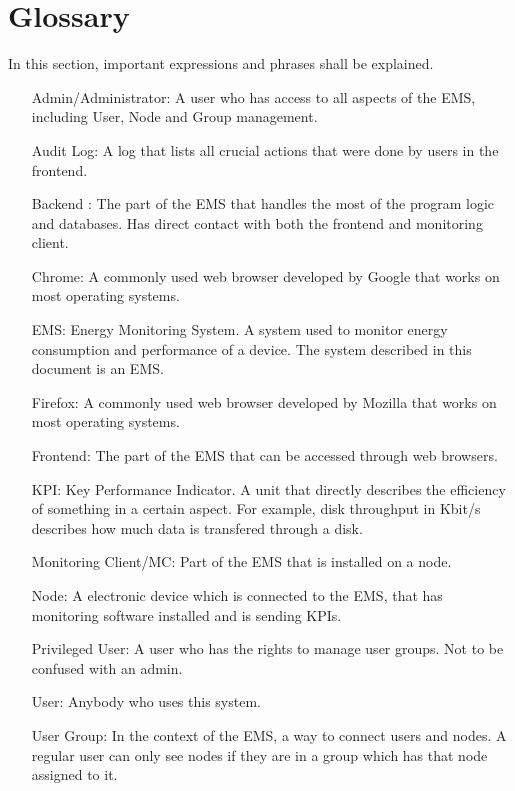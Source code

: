 \documentclass[twoside,a4paper]{refart}
\begin{document}
\section{Glossary} 
In this section, important expressions and phrases shall be explained.
\begin{itemize}	
	\item[Admin/Administrator:] A user who has access to all aspects of the EMS, including User, Node and Group management.
	\item[Audit Log:] A log that lists all crucial actions that were done by users in the frontend.
	\item[Backend]: The part of the EMS that handles the most of the program logic and databases. Has direct contact with both the frontend and monitoring client.
	\item[Chrome:] A commonly used web browser developed by Google that works on most operating systems.
	\item[EMS:] Energy Monitoring System. A system used to monitor energy consumption and performance of a device. The system described in this document is an EMS.
	\item[Firefox:] A commonly used web browser developed by Mozilla that works on most operating systems.
	\item[Frontend:] The part of the EMS that can be accessed through web browsers.
	\item[KPI:] Key Performance Indicator. A unit that directly describes the efficiency of something in a certain aspect. For example, disk throughput in Kbit/s describes how much data is transfered through a disk.
	\item[Monitoring Client/MC:] Part of the EMS that is installed on a node.
	\item[Node:] A electronic device which is connected to the EMS, that has monitoring software installed and is sending KPIs.
	\item[Privileged User:] A user who has the rights to manage user groups. Not to be confused with an admin.
	\item[User:] Anybody who uses this system.
	\item[User Group:] In the context of the EMS, a way to connect users and nodes. A regular user can only see nodes if they are in a group which has that node assigned to it.
	\end{itemize}
    
\end{document}
